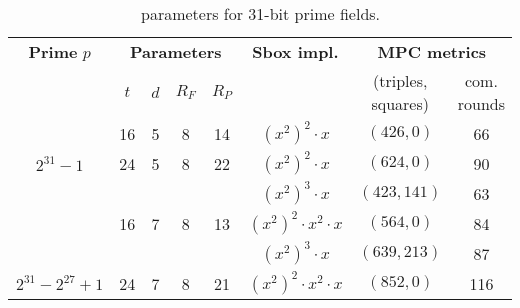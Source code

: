 \renewcommand\arraystretch{1.25}
\begin{table}[htbp]
	\centering
	\begin{tabular}{cccccccc}
		\toprule
    		\textbf{Prime} $p$ & \multicolumn{4}{c}{\textbf{Parameters}} & \textbf{Sbox impl.} & \multicolumn{2}{c}{\textbf{MPC metrics}}\\
    		 & {$t$} & {$d$} & {$R_F$} & {$R_P$} & & (triples, squares) & com. rounds\\
    		\midrule
    		& 16 & 5 & 8 & 14 & $(x^2)^2 \cdot x$ & $(426, 0)$ & 66 \\
    		\multirow{-2}{*}{$2^{31}-1$} & 24 & 5 & 8 & 22 &  $(x^2)^2 \cdot x$ & $(624, 0)$ & 90\\
    		\midrule
    		& & & & & $(x^2)^3 \cdot x$ & $(423, 141)$ & 63\\
    		& \multirow{-2}{*}{16} & \multirow{-2}{*}{7} & \multirow{-2}{*}{8} & \multirow{-2}{*}{13} & $(x^2)^2 \cdot x^2 \cdot x$ & $(564, 0)$ & 84\\
    	    & & & & & $(x^2)^3 \cdot x$ & $(639, 213)$  & 87\\
    		\multirow{-4}{*}{$2^{31}-2^{27} + 1$}  & \multirow{-2}{*}{24}  & \multirow{-2}{*}{7} & \multirow{-2}{*}{8} & \multirow{-2}{*}{21} &  $(x^2)^2 \cdot x^2 \cdot x$  & $(852, 0)$ & 116\\
    		\bottomrule
	\end{tabular}
	\caption{\PoseidonTwoPi parameters for 31-bit prime fields.\label{tab:poseidon2_inst31}}
\end{table}


